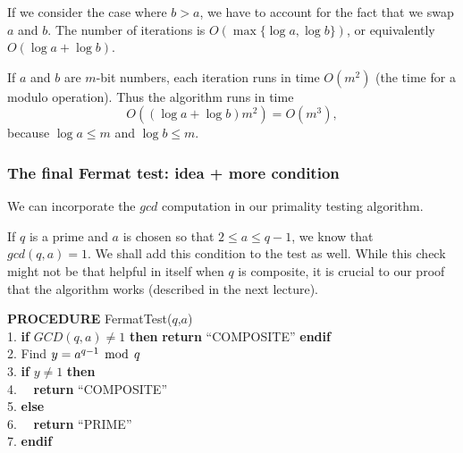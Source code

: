 \begin{frame}
  If we consider the case where $b>a$, we have to account for the fact
  that we swap $a$ and $b$.  The number of iterations is $O(\max\{\log
  a,\log b\})$, or equivalently $O(\log a + \log b)$.

  If $a$ and $b$ are $m$-bit numbers, each iteration runs in time
  $O(m^2)$ (the time for a modulo operation).  Thus the algorithm runs
  in time
  \[
  O((\log a + \log b)m^2)=O(m^3),
  \]
  because $\log a \leq m$ and $\log b\leq m$.
\end{frame}

\begin{frame}\frametitle{The final Fermat test: idea + more condition}
  We can incorporate the $gcd$ computation in our primality testing
  algorithm.
  
  If $q$ is a prime and $a$ is chosen so that $2\leq a\leq q-1$, we
  know that $gcd(q,a)=1$.  We shall add this condition to the test as
  well.  While this check might not be that helpful in itself when $q$
  is composite, it is crucial to our proof that the algorithm works
  (described in the next lecture).

  \begin{tcolorbox}
    {\bf PROCEDURE} FermatTest($q$,$a$)\\
    1. {\bf if} $GCD(q,a)\neq 1$ {\bf then} {\bf return} ``COMPOSITE'' {\bf endif}\\
    2. Find $y = a^{q-1}\,\bmod\, q$\\
    3. {\bf if} $y\neq 1$ {\bf then}\\
    4. \ \ {\bf return} ``COMPOSITE''\\
    5. {\bf else}\\
    6. \ \ {\bf return} ``PRIME''\\
    7. {\bf endif}
  \end{tcolorbox}
\end{frame}

